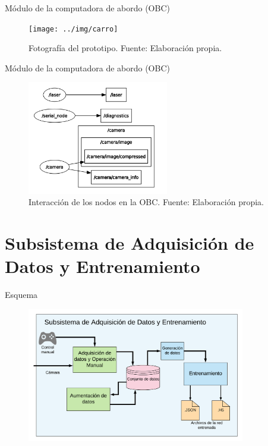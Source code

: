 \documentclass[10pt]{beamer}
\begin{document}
\begin{frame}{Módulo de la computadora de abordo (OBC)}
    \begin{figure}[!h] 
        \centering
        \texttt{[image: ../img/carro]}
        \caption[Fotografía del prototipo]{Fotografía del prototipo. Fuente: Elaboración propia. }
        \end{figure}
\end{frame}

\begin{frame}{Módulo de la computadora de abordo (OBC)}
    \begin{figure}[!h] 
        \centering
        \includegraphics[width=0.55\textwidth]{../img/nodosobc}
        \caption[Interacción de los nodos en la OBC]{Interacción de los nodos en la OBC. Fuente: Elaboración propia. }
    
    \end{figure}
\end{frame}


\section{Subsistema de Adquisición de Datos y Entrenamiento}

\begin{frame}{Esquema}
    \begin{figure}[!h] 
        \centering
        \includegraphics[width=0.85\textwidth]{../img/daq_esq}
        \end{figure}
\end{frame}
\end{document}
